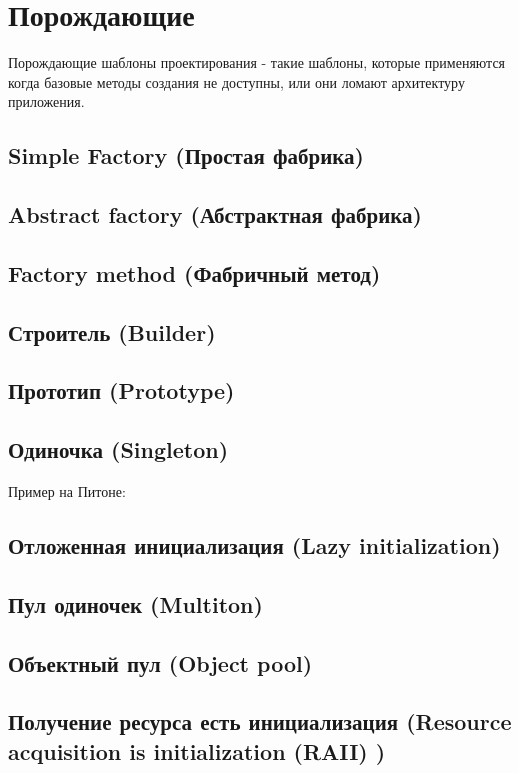 \section{Порождающие}

Порождающие шаблоны проектирования - такие шаблоны, которые применяются когда базовые методы создания не доступны, или они ломают архитектуру приложения.

\subsection{Simple Factory (Простая фабрика)}
\subsection{Abstract factory (Абстрактная фабрика)}
\subsection{Factory method (Фабричный метод)}
\subsection{Строитель (Builder)}
\subsection{Прототип (Prototype)}
\subsection{Одиночка (Singleton)}
Пример на Питоне:
\linenumbers
{}
\nolinenumbers
\subsection{Отложенная инициализация (Lazy initialization)}
\subsection{Пул одиночек (Multiton)}
\subsection{Объектный пул (Object pool)}
\subsection{Получение ресурса есть инициализация (Resource acquisition is initialization (RAII) )}

